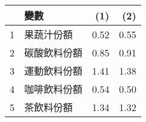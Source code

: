 \begin{tabular}{rlrr}
  \hline
 & 變數 & (1) & (2) \\ 
  \hline
1 & 果蔬汁份額 & 0.52 & 0.55 \\ 
  2 & 碳酸飲料份額 & 0.85 & 0.91 \\ 
  3 & 運動飲料份額 & 1.41 & 1.38 \\ 
  4 & 咖啡飲料份額 & 0.54 & 0.50 \\ 
  5 & 茶飲料份額 & 1.34 & 1.32 \\ 
   \hline
\end{tabular}
